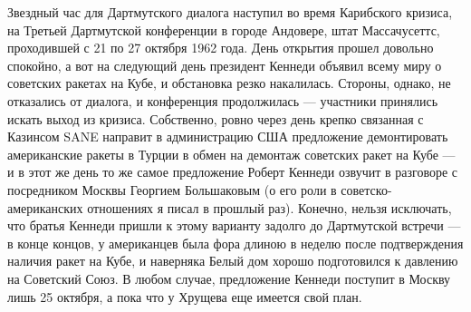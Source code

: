 Звездный час для Дартмутского диалога наступил во время Карибского кризиса, на Третьей Дартмутской конференции в городе Андовере, штат Массачусеттс, проходившей с 21 по 27 октября 1962 года. День открытия прошел довольно спокойно, а вот на следующий день президент Кеннеди объявил всему миру о советских ракетах на Кубе, и обстановка резко накалилась. Стороны, однако, не отказались от диалога, и конференция продолжилась — участники принялись искать выход из кризиса. Собственно, ровно через день крепко связанная с Казинсом SANE направит в администрацию США предложение демонтировать американские ракеты в Турции в обмен на демонтаж советских ракет на Кубе — и в этот же день то же самое предложение Роберт Кеннеди озвучит в разговоре с посредником Москвы Георгием Большаковым (о его роли в советско-американских отношениях я писал в прошлый раз). Конечно, нельзя исключать, что братья Кеннеди пришли к этому варианту задолго до Дартмутской встречи — в конце концов, у американцев была фора длиною в неделю после подтверждения наличия ракет на Кубе, и наверняка Белый дом хорошо подготовился к давлению на Советский Союз. В любом случае, предложение Кеннеди поступит в Москву лишь 25 октября, а пока что у Хрущева еще имеется свой план.

